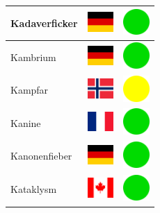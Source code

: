 \documentclass[12pt, a4paper, twoside]{report}
\begin{document}
\begin{center}
\begin{longtable}{|p{5cm}|p{2cm}|p{2cm}|}
Kadaverficker & \includegraphics[width=1cm]{4x3/de} & \includegraphics[width=1cm]{likes/y} \\ \hline
Kambrium & \includegraphics[width=1cm]{4x3/de} & \includegraphics[width=1cm]{likes/y} \\ \hline
Kampfar & \includegraphics[width=1cm]{4x3/no} & \includegraphics[width=1cm]{likes/m} \\ \hline
Kanine & \includegraphics[width=1cm]{4x3/fr} & \includegraphics[width=1cm]{likes/y} \\ \hline
Kanonenfieber & \includegraphics[width=1cm]{4x3/de} & \includegraphics[width=1cm]{likes/y} \\ \hline
Kataklysm & \includegraphics[width=1cm]{4x3/ca} & \includegraphics[width=1cm]{likes/y} \\ \hline

\end{longtable}
\end{center}
\end{document}
